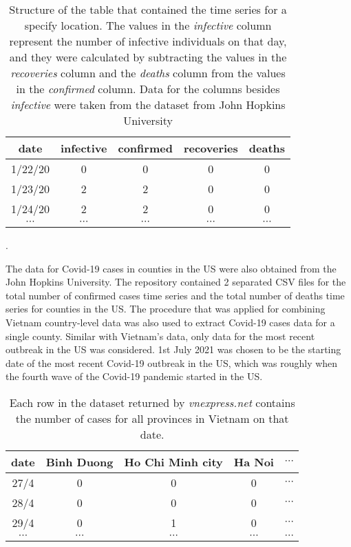 \begin{table}[h]
\centering
\begin{tabular}{| c | c | c | c | c |}
    date & infective & confirmed & recoveries & deaths \\
    \hline\hline
    1/22/20 & 0 & 0 & 0 & 0 \\
    \hline
    1/23/20 & 2 & 2 & 0 & 0 \\
    \hline
    1/24/20 & 2 & 2 & 0 & 0 \\
    \hline
    $\cdots$ & $\cdots$ & $\cdots$ & $\cdots$ & $\cdots$ \\
\end{tabular}
\caption[Combined Covid-19 dataset structure]{Structure of the table that contained the time series for a specify location. The values in the \textit{infective} column represent the number of infective individuals on that day, and they were calculated by subtracting the values in the \textit{recoveries} column and the \textit{deaths} column from the values in the \textit{confirmed} column. Data for the columns besides \textit{infective} were taken from the dataset from John Hopkins University \cite{dongInteractiveWebbasedDashboard2020}}.
\label{tab:country-covid-timeseries}
\end{table}

The data for Covid-19 cases in counties in the \gls{US} were also obtained from the John Hopkins University.
The repository contained 2 separated CSV files for the total number of confirmed cases time series and the total number of deaths time series for counties in the \gls{US}.
The procedure that was applied for combining Vietnam country-level data was also used to extract Covid-19 cases data for a single county.
Similar with Vietnam's data, only data for the most recent outbreak in the \gls{US} was considered.
1st July 2021 was chosen to be the starting date of the most recent Covid-19 outbreak in the US, which was roughly when the fourth wave of the Covid-19 pandemic started in the \gls{US}.

\begin{table}[h]
\centering
\begin{tabular}{|c | c | c | c | c }
    date & Binh Duong & Ho Chi Minh city & Ha Noi & $\cdots$ \\
    \hline\hline
    27/4 & 0 & 0 & 0 & $\cdots$ \\
    \hline
    28/4 & 0 & 0 & 0 & $\cdots$ \\
    \hline
    29/4 & 0 & 1 & 0 & $\cdots$ \\
    \hline
    $\cdots$ & $\cdots$ & $\cdots$ & $\cdots$ & $\cdots$ \\
\end{tabular}
\caption[VnExpress Covid-19 dataset structure]{Each row in the dataset returned by \textit{vnexpress.net} contains the number of cases for all provinces in Vietnam on that date.}
\label{tab:vietnam-provinces-timeseries}
\end{table}

